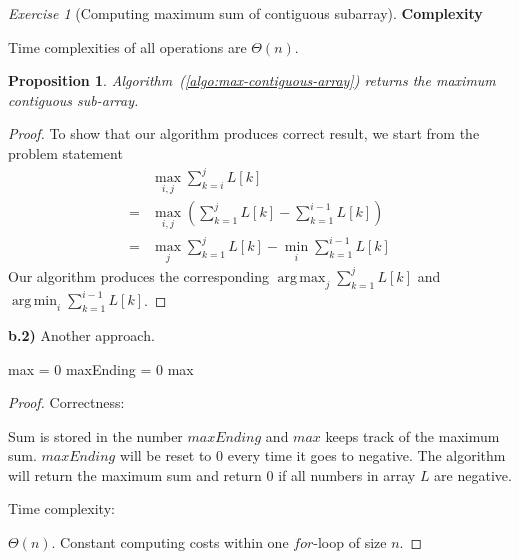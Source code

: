 \documentclass[a4paper,10pt,twoside]{article}
\DeclareMathOperator*{\argmin}{arg\,min}
\DeclareMathOperator*{\argmax}{arg\,max}
\theoremstyle{plain}
\newtheorem{proposition}[theorem]{Proposition}
\theoremstyle{definition}
\theoremstyle{remark}
\newtheorem{exercise}{Exercise}
\begin{document}
\begin{exercise}[Computing maximum sum of contiguous subarray]
\textbf{Complexity}

Time complexities of all operations are $\Theta(n)$.

\begin{proposition}
Algorithm~(\ref{algo:max-contiguous-array}) returns the maximum contiguous
sub-array.
\end{proposition}

\begin{proof}
To show that our algorithm produces correct result, we start from the
problem statement
\[
	\begin{aligned}
	&\max_{i, j} \sum_{k=i}^j L[k] \\
	=&\max_{i, j} \left( \sum_{k=1}^j L[k] - \sum_{k=1}^{i-1} L[k] \right)\\
	=&\max_{j} \sum_{k=1}^j L[k] - \min_{i}\sum_{k=1}^{i-1} L[k] 
	\end{aligned}
\]
Our algorithm produces the corresponding $\argmax_j\sum_{k=1}^j L[k]$ 
and $\argmin_i\sum_{k=1}^{i-1} L[k]$.
\end{proof}

\textbf{b.2)} 
Another approach.

\begin{algorithm}[h]
	\caption{DP Sum($L[1..n]$)}
	max = 0\;
    	maxEnding = 0\;
	\Return max

\end{algorithm}

\begin{proof}

Correctness: 

Sum is stored in the number $maxEnding$ and $max$ keeps track of the maximum sum.  $maxEnding$ will be reset to $0$ every time it goes to negative. 
The algorithm will return the maximum sum and return 0 if all numbers in array $L$ are negative.

Time complexity:

$\Theta(n)$. Constant computing costs within one $for$-loop of size $n$. 

\end{proof}
\end{exercise}
\end{document}
